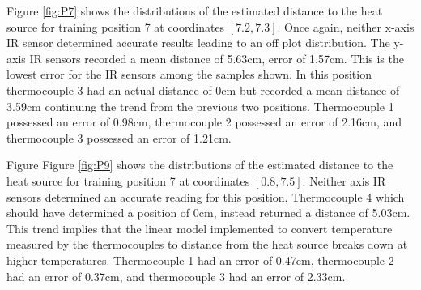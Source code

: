 \documentclass[12pt]{article}
\begin{document}
Figure \ref{fig:P7} shows the distributions of the estimated distance to the heat source for training position 7 at coordinates $[7.2, 7.3]$. Once again, neither x-axis IR sensor determined accurate results leading to an off plot distribution. The y-axis IR sensors recorded a mean distance of 5.63cm, error of 1.57cm. This is the lowest error for the IR sensors among the samples shown. In this position thermocouple 3 had an actual distance of 0cm but recorded a mean distance of 3.59cm continuing the trend from the previous two positions. Thermocouple 1 possessed an error of 0.98cm, thermocouple 2 possessed an error of 2.16cm, and thermocouple 3 possessed an error of 1.21cm.

Figure Figure \ref{fig:P9} shows the distributions of the estimated distance to the heat source for training position 7 at coordinates $[0.8, 7.5]$. Neither axis IR sensors determined an accurate reading for this position. Thermocouple 4 which should have determined a position of 0cm, instead returned a distance of 5.03cm. This trend implies that the linear model implemented to convert temperature measured by the thermocouples to distance from the heat source breaks down at higher temperatures. Thermocouple 1 had an error of 0.47cm, thermocouple 2 had an error of 0.37cm, and thermocouple 3 had an error of 2.33cm.
\end{document}
